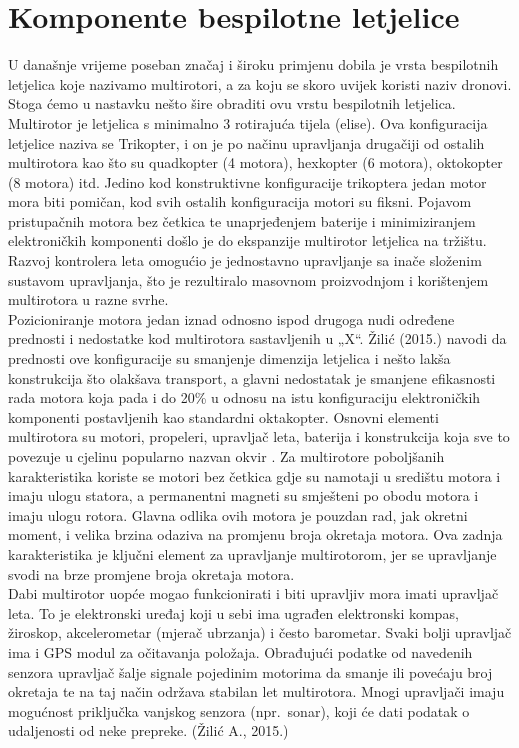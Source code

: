 \documentclass[times, utf8, diplomski]{fer}
\begin{document}
{\section{Komponente bespilotne letjelice}
U današnje vrijeme poseban značaj i široku primjenu dobila je vrsta bespilotnih letjelica koje nazivamo multirotori,  a za koju  se skoro uvijek koristi naziv  dronovi.  Stoga ćemo  u nastavku nešto šire obraditi ovu vrstu bespilotnih letjelica.\\
Multirotor je letjelica s minimalno 3 rotirajuća tijela (elise). Ova konfiguracija letjelice naziva se Trikopter, i on je po načinu upravljanja drugačiji od ostalih multirotora kao što su quadkopter   (4   motora),   hexkopter   (6   motora),   oktokopter   (8   motora)   itd.   Jedino   kod konstruktivne konfiguracije  trikoptera  jedan  motor  mora  biti pomičan,  kod  svih  ostalih konfiguracija  motori  su  fiksni.  Pojavom pristupačnih motora bez četkica   te unaprjeđenjem baterije  i minimiziranjem elektroničkih  komponenti  došlo  je  do  ekspanzije multirotor letjelica na tržištu. Razvoj kontrolera leta omogućio je jednostavno upravljanje sa inače složenim sustavom upravljanja, što je rezultiralo masovnom proizvodnjom i korištenjem multirotora u razne svrhe.\\
Pozicioniranje  motora  jedan  iznad  odnosno ispod drugoga nudi određene prednosti i nedostatke  kod  multirotora  sastavljenih  u  „X“.  Žilić  (2015.)  navodi  da  prednosti  ove konfiguracije su smanjenje dimenzija letjelica i nešto lakša konstrukcija što olakšava transport, a glavni nedostatak je smanjene efikasnosti rada motora koja pada i do 20\% u odnosu na istu konfiguraciju  elektroničkih  komponenti  postavljenih  kao  standardni  oktakopter.  Osnovni elementi  multirotora  su  motori,  propeleri, upravljač leta,  baterija  i  konstrukcija  koja  sve  to povezuje   u   cjelinu   popularno   nazvan   okvir   .  Za  multirotore  poboljšanih karakteristika koriste se motori bez četkica gdje su namotaji u središtu motora i imaju ulogu statora, a permanentni magneti su smješteni po obodu motora i imaju ulogu rotora. Glavna odlika ovih motora je pouzdan rad, jak okretni moment, i velika brzina odaziva na promjenu broja okretaja motora. Ova zadnja karakteristika je ključni element za upravljanje multirotorom, jer se upravljanje svodi na brze promjene broja okretaja motora.\\
Dabi multirotor uopće mogao funkcionirati i biti upravljiv mora imati upravljač leta. To je elektronski uređaj koji u sebi ima ugrađen elektronski kompas, žiroskop, akcelerometar (mjerač ubrzanja) i često barometar. Svaki bolji upravljač ima i GPS  modul za očitavanja položaja. Obrađujući podatke od navedenih senzora upravljač šalje signale pojedinim motorima da smanje ili povećaju broj okretaja te na taj način održava stabilan let  multirotora.  Mnogi upravljači imaju mogućnost priključka vanjskog senzora  (npr.~sonar), koji će dati podatak o udaljenosti od neke prepreke. (Žilić A., 2015.)\\
}
\end{document}

